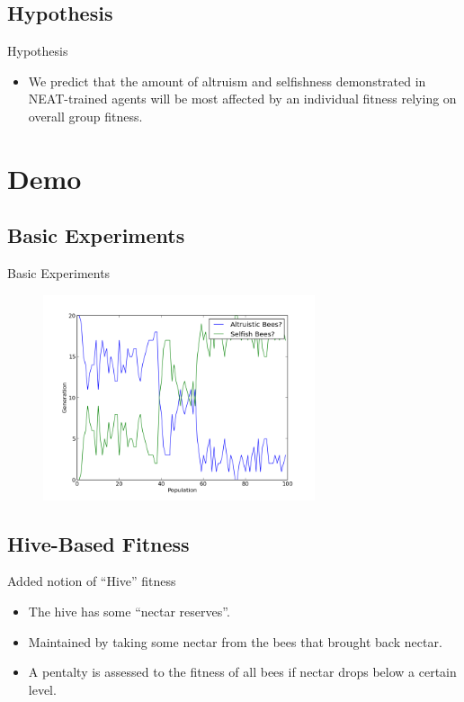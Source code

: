\documentclass{beamer}
\begin{document}
	\subsection{Hypothesis}
    \begin{frame}{Hypothesis}
            \begin{itemize}
                    \item We predict that the amount of altruism and selfishness demonstrated in NEAT-trained agents will be most affected by an individual fitness relying on overall group fitness.

            \end{itemize}
    \end{frame}

	\section{Demo}

	\subsection{Basic Experiments}

	\begin{frame}{Basic Experiments}
		\begin{figure}
			
		\includegraphics[width=8cm]{s_bees.png}
		\end{figure}

	\end{frame}

	\subsection{Hive-Based Fitness}

	\begin{frame}{Added notion of ``Hive'' fitness}
		\begin{itemize}
			\item The hive has some ``nectar reserves''.
			\item Maintained by taking some nectar from the bees that brought back nectar.
			\item A pentalty is assessed to the fitness of all bees if nectar drops below a certain level.
		\end{itemize}
	\end{frame}
\end{document}
